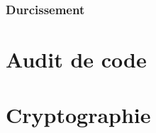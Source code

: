 \documentclass[twoside,a4paper,12pt,titlepage]{book}
\begin{document}
\subsection{Durcissement}

\chapter{Audit de code}


\appendix
\chapter{Cryptographie}


\clearpage
{}
\printindex 
\newpage
\clearpage
\printglossary[type=\acronymtype]
\printglossary[type=main]
\end{document}
